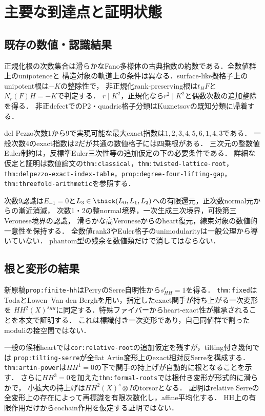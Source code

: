 \documentclass[11pt,a4paper]{ltjsarticle}
\begin{document}
\section{主要な到達点と証明状態}
\subsection{既存の数値・認識結果}
正規化根の次数集合は滑らかなFano多様体の古典指数の約数である．全数値群上のunipotenceと
構造対象の軌道上の条件は異なる．surface-like擬格子上のunipotent根は$-K$の整除性で，
非正規化rank-preserving根は$t_HF$と$N_r(F)H=-K$で判定する．
$r\mid K^2$，正規化なら$r^2\mid K^2$と偶数次数の追加整除を得る．
非正defectでのP2・quadric格子分類はKuznetsovの既知分類に帰着する．

del Pezzo次数1から9で実現可能な最大exact指数は$1,2,3,4,5,6,1,4,3$である．
一般次数4のexact指数は2だが共通の数値格子には四乗根がある．
三次元の整数値Euler制約は，反標準Euler三次性等の追加仮定の下の必要条件である．
詳細な仮定と証明は数値論文の\texttt{thm:classical}，\texttt{thm:twisted-lattice-root}，
\texttt{thm:delpezzo-exact-index-table}，\texttt{prop:degree-four-lifting-gap}，\texttt{thm:threefold-arithmetic}を参照する．

次数9認識は$E_{-1}=0$と$L_3\in\thick(L_0,L_1,L_2)$への有限還元，正次数normal元からの漸近消滅，
次数1・2の整normal境界，一次生成三次境界，可換第三Veronese境界の認識，
滑らかな高Veroneseからのheart復元，線束対象の数値的一意性を保持する．
全数値rank3やEuler格子のunimodularityは一般公理から導いていない．
phantom型の残余を数値類だけで消してはならない．

\subsection{根と変形の結果}
新原稿\texttt{prop:finite-hh}はPerryのSerre自明性から$s_{HH}^r=1$を得る．
\texttt{thm:fixed}はTodaとLowen--Van den Berghを用い，指定したexact関手が持ち上がる一次変形を
$HH^2(X)^{s_{HH}}$に同定する．特殊ファイバーからheart-exact性が継承されることを本文で証明する．
これは標識付き一次変形であり，自己同値群で割ったmoduliの接空間ではない．

一般の候補heartでは\texttt{cor:relative-root}の追加仮定を残すが，tilting付き幾何では
\texttt{prop:tilting-serre}が全flat Artin変形上のexact相対反Serreを構成する．
\texttt{thm:artin-power}は$HH^1=0$の下で関手の持上げが自動的に根となることを示す．
さらに$HH^3=0$を加えた\texttt{thm:formal-roots}では根付き変形が形式的に滑らかで，
小拡大の持上げは$HH^2(X)^s\otimes I$のtorsorとなる．
証明はrelative Serreの全変形上の存在によって再標識を有限次数化し，affine平均化する．
HH上の有限作用だけからcochain作用を仮定する証明ではない．
\end{document}
